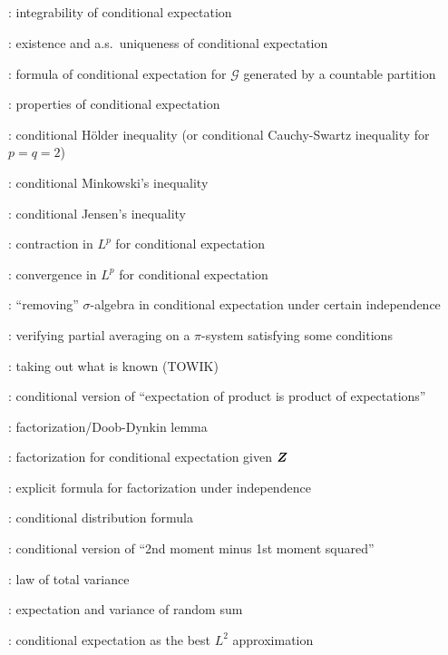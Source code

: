 \subsection*{}
\item {}: integrability of conditional expectation
\item {}: existence and a.s.\ uniqueness of conditional expectation
\item {}: formula of conditional expectation for \(\mathcal{G}\) generated by a countable partition
\item {}: properties of conditional expectation
\item {}: conditional H\"older inequality (or
conditional Cauchy-Swartz inequality for \(p=q=2\))
\item {}: conditional Minkowski's inequality
\item {}: conditional Jensen's inequality
\item {}: contraction in \(L^{p}\) for conditional expectation
\item {}: convergence in \(L^{p}\) for conditional expectation
\item {}: ``removing'' \(\sigma\)-algebra
in conditional expectation under certain independence
\item {}: verifying partial averaging on a
\(\pi\)-system satisfying some conditions
\item {}: taking out what is known (TOWIK)
\item {}: conditional version of ``expectation of product is product of expectations''
\item {}: factorization/Doob-Dynkin lemma
\item {}: factorization for conditional expectation given \(\bm{Z}\)
\item {}: explicit formula for factorization under independence
\item {}: conditional distribution formula
\item {}: conditional version of ``2nd moment minus 1st moment
squared''
\item {}: law of total variance
\item {}: expectation and variance of random sum
\item {}: conditional expectation as the best \(L^{2}\) approximation
